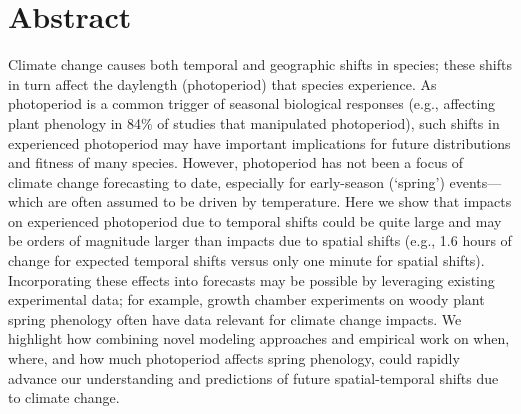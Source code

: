 \documentclass{article}
\begin{document}


\linenumbers
\section*{Abstract}
Climate change causes both temporal and geographic shifts in species; these shifts in turn affect the daylength (photoperiod) that species experience. As photoperiod is a common trigger of seasonal biological responses (e.g., affecting plant phenology in 84\% of studies that manipulated photoperiod), such shifts in experienced photoperiod may have important implications for future distributions and fitness of many species. However, photoperiod has not been a focus of climate change forecasting to date, especially for early-season (`spring') events---which are often assumed to be driven by temperature. Here we show that impacts on experienced photoperiod due to temporal shifts could be quite large and may be orders of magnitude larger than impacts due to spatial shifts (e.g., 1.6 hours of change for expected temporal shifts versus only one minute for spatial shifts). Incorporating these effects into forecasts may be possible by leveraging existing experimental data; for example, growth chamber experiments on woody plant spring phenology often have data relevant for climate change impacts. We highlight how combining novel modeling approaches and empirical work on when, where, and how much photoperiod affects spring phenology, could rapidly advance our understanding and predictions of future spatial-temporal shifts due to climate change. %
\end{document}
